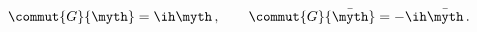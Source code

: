 \begin{equation}
  \commut{G}{\myth}=\ih \myth\,,\qquad
  \commut{G}{\bar\myth}=-\ih\bar\myth\,.
\end{equation}

